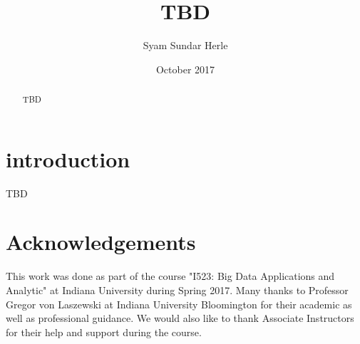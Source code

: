 \documentclass[sigconf]{acmart}
\begin{document}
\title{TBD}
 
 \author{Syam Sundar Herle}
 
 
 
 
 \date{October 2017}


\begin{abstract}
TBD
\end{abstract}



\maketitle

\section{introduction}

TBD \cite{wwwbigdata} 

\section*{Acknowledgements}

This work was done as part of the course "I523: Big Data Applications and Analytic" at Indiana University during Spring 2017. Many thanks to Professor Gregor von Laszewski at Indiana University Bloomington for their academic as well as professional guidance. We would also like to thank Associate Instructors for their help and support during the course. 



\end{document}
